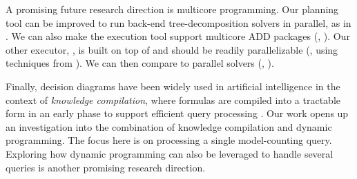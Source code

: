 A promising future research direction is multicore programming.
Our planning tool \Lg{} can be improved to run back-end tree-decomposition solvers in parallel, as in \cite{dudek2020parallel}.
We can also make the execution tool \Dmc{} support multicore ADD packages (\eg, \sylvan{} \cite{van2015sylvan}).
Our other executor, \Tensor{}, is built on top of \Numpy{} \cite{numpy} and should be readily parallelizable (\eg, using techniques from \cite{dudek2020parallel}).
We can then compare \Dpmc{} to parallel solvers (\eg, \cite{dal2018parallel,BSB15}).

Finally, decision diagrams have been widely used in artificial intelligence in the context of \emph{knowledge compilation}, where formulas are compiled into a tractable form in an early phase to support efficient query processing \cite{koriche2013knowledge,LM17,darwiche2004new,OD15}.
Our work opens up an investigation into the combination of knowledge compilation and dynamic programming.
The focus here is on processing a single model-counting query.
Exploring how dynamic programming can also be leveraged to handle several queries is another promising research direction.
